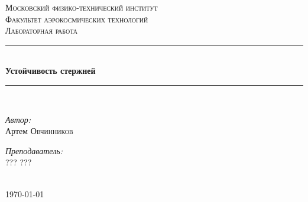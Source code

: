 \documentclass[a4paper,12pt]{article} %
\begin{document}
\begin{titlepage}
\newcommand{\HRule}{\rule{\linewidth}{0.3 mm}} %

\center %
 

\textsc{\Large Московский физико-технический институт }\\[1.5cm] %
\textsc{\Large Факультет аэрокосмических технологий}\\[0.5cm] %
\textsc{\large Лабораторная работа }\\[0.5cm] %


\HRule \\[0.4cm]
{ \huge \bfseries Устойчивость стержней }\\[0.4cm] %
\HRule \\[1.5cm]
 

\begin{minipage}{0.4\textwidth}
\begin{flushleft} \large
\emph{Автор:}\\ Артем \textsc{Овчинников} %
\end{flushleft}
\end{minipage}
\begin{minipage}{0.4\textwidth}
\begin{flushright} \large
\emph{Преподаватель:} \\
??? \textsc{???} %
\end{flushright}
\end{minipage}\\[4cm]

{\large \today}\\[2cm] %


 

\vfill %

\end{titlepage}
\tableofcontents
\end{document}
